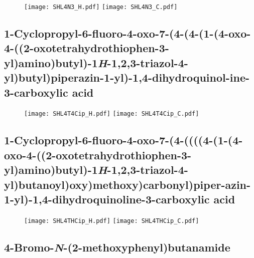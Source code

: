 \begin{figure}[H]
	\centering
		\texttt{[image: SHL4N3\_H.pdf]}
		\texttt{[image: SHL4N3\_C.pdf]}
\end{figure}



\subsection{1\hyp{}Cyclopropyl\hyp{}6\hyp{}fluoro\hyp{}4\hyp{}oxo\hyp{}7\hyp{}(4\hyp{}(4\hyp{}(1\hyp{}(4\hyp{}oxo\hyp{}4\hyp{}((2\hyp{}oxotetrahydrothiophen\hyp{}3\hyp{}yl)amino)butyl)\hyp{}1\textit{H}\hyp{}1,2,3\hyp{}triazol\hyp{}4\hyp{}yl)butyl)piperazin\hyp{}1\hyp{}yl)\hyp{}1,4\hyp{}dihydroquinol\hyp{}ine\hyp{}3\hyp{}carboxylic acid }

\begin{figure}[H]
	\centering
		\texttt{[image: SHL4T4Cip\_H.pdf]}
		\texttt{[image: SHL4T4Cip\_C.pdf]}
\end{figure}

\subsection{1\hyp{}Cyclopropyl\hyp{}6\hyp{}fluoro\hyp{}4\hyp{}oxo\hyp{}7\hyp{}(4\hyp{}((((4\hyp{}(1\hyp{}(4\hyp{}oxo\hyp{}4\hyp{}((2\hyp{}oxotetrahydrothiophen\hyp{}3\hyp{}yl)amino)butyl)\hyp{}1\textit{H}\hyp{}1,2,3\hyp{}triazol\hyp{}4\hyp{}yl)butanoyl)oxy)methoxy)carbonyl)piper\hyp{}azin\hyp{}1\hyp{}yl)\hyp{}1,4\hyp{}dihydroquinoline\hyp{}3\hyp{}carboxylic acid }

\begin{figure}[H]
	\centering
		\texttt{[image: SHL4THCip\_H.pdf]}
		\texttt{[image: SHL4THCip\_C.pdf]}
\end{figure}

\subsection{4\hyp{}Bromo\hyp{}\textit{N}\hyp{}(2\hyp{}methoxyphenyl)butanamide }

